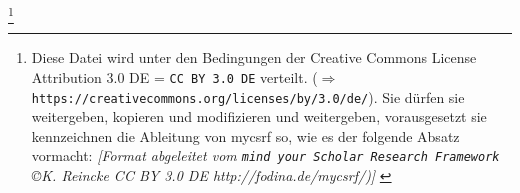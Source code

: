 %
%
%

\footnote{Diese Datei wird unter den Bedingungen der Creative Commons License
Attribution 3.0 DE = \texttt{CC BY 3.0 DE} verteilt. ($\Rightarrow$
\texttt{https://creativecommons.org/licenses/by/3.0/de/}). Sie dürfen sie
weitergeben, kopieren und modifizieren und weitergeben, vorausgesetzt sie
kennzeichnen die Ableitung von mycsrf so, wie es der folgende Absatz vormacht:
\newline  
{ \tiny \itshape [Format abgeleitet vom \texttt{mind your Scholar Research
Framework} \copyright K. Reincke CC BY 3.0 DE http://fodina.de/mycsrf/)] }}

